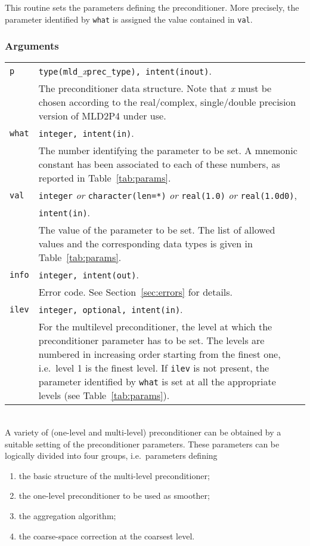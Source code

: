 \noindent
This routine sets the parameters defining the preconditioner. More
precisely, the parameter identified by \verb|what| is assigned the value
contained in \verb|val|.

\subsubsection*{Arguments}

\begin{tabular}{p{1.2cm}p{11.5cm}}
\verb|p|      & \verb|type(mld_|\emph{x}\verb|prec_type), intent(inout)|.\\
              & The preconditioner data structure. Note that \emph{x} must be chosen according
                to the real/complex, single/double precision version of MLD2P4 under use.\\
\verb|what|   & \verb|integer, intent(in)|. \\
              & The number identifying the parameter to be set.
                A mnemonic constant has been associated to each of these
                numbers, as reported in Table~\ref{tab:params}.\\
\verb|val |   & \verb|integer| \emph{or} \verb|character(len=*)| \emph{or} \verb|real(1.0)|
                \emph{or} \verb|real(1.0d0)|,\\
              & \verb|intent(in)|.\\
              & The value of the parameter to be set. The list of allowed
                values and the corresponding data types is given in Table~\ref{tab:params}.\\
\verb|info|   & \verb|integer, intent(out)|.\\
              & Error code. See Section~\ref{sec:errors} for details.\\
\verb|ilev|   & \verb|integer, optional, intent(in)|.\\
              & For the multilevel preconditioner, the level at which the
                preconditioner parameter has to be set. The levels are numbered in increasing
                order starting from the finest one, i.e.\ level 1 is the finest level.
                If \verb|ilev| is not present, the parameter identified by \verb|what|
                is set at all the appropriate levels (see Table~\ref{tab:params}).
\end{tabular}

\ \\
A variety of (one-level and multi-level) preconditioner can be obtained by a suitable
setting of the preconditioner parameters. These parameters can be logically divided into
four groups, i.e.\ parameters defining
\begin{enumerate}
	\item the basic structure of the multi-level preconditioner;
	\item the one-level preconditioner to be used as smoother;
	\item the aggregation algorithm;
	\item the coarse-space correction at the coarsest level.
\end{enumerate}

